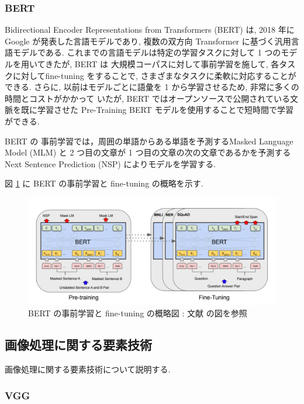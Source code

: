 \newpage
\changeindent{0cm}
\subsubsection{BERT}
\changeindent{2cm}
Bidirectional Encoder Representations from Transformers (BERT) \cite{devlin2018bert} は, 2018 年に
Google が発表した言語モデルであり, 複数の双方向 Transformer に基づく汎用言語モデルである.
これまでの言語モデルは特定の学習タスクに対して 1 つのモデルを用いてきたが, BERT は
大規模コーパスに対して事前学習を施して, 各タスクに対してfine-tuning をすることで,
さまざまなタスクに柔軟に対応することができる. さらに, 以前はモデルごとに語彙を 1 から学習させるため, 非常に多くの時間とコストがかかって
いたが, BERT ではオープンソースで公開されている文脈を既に学習させた Pre-Training BERT モデルを使用することで短時間で学習ができる.

BERT の 事前学習では，周囲の単語からある単語を予測するMasked Language Model (MLM)
と 2 つ目の文章が 1 つ目の文章の次の文章であるかを予測する Next Sentence Prediction (NSP) によりモデルを学習する.

図 \ref{fig:bert_pre} に BERT の事前学習と fine-tuning の概略を示す.

\begin{figure}[h]
  \begin{center}
    \includegraphics[width=0.8\hsize]{doc/figures/bert_pre.png}
    \caption{BERT の事前学習と fine-tuning の概略図 : 文献 の図を参照}
    \label{fig:bert_pre}
  \end{center}
\end{figure}

\newpage
\changeindent{0cm}
\subsection{画像処理に関する要素技術}
\changeindent{2cm}

画像処理に関する要素技術について説明する.

\changeindent{0cm}
\subsubsection{VGG}
\changeindent{2cm}


